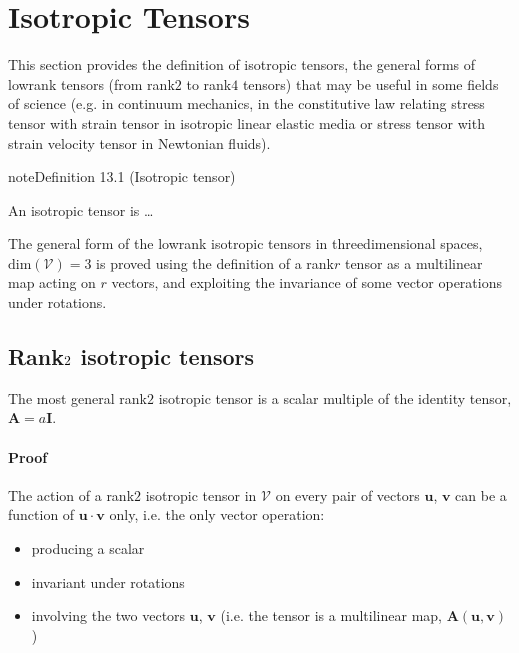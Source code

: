 \documentclass[letterpaper,10pt,english]{jupyterBook}
\begin{document}
\sphinxstepscope


\chapter{Isotropic Tensors}
\label{\detokenize{ch/tensor-algebra-calculus/algebra-isotropic-tensors:isotropic-tensors}}\label{\detokenize{ch/tensor-algebra-calculus/algebra-isotropic-tensors:tensor-algebra-isotropic-tensors}}\label{\detokenize{ch/tensor-algebra-calculus/algebra-isotropic-tensors::doc}}
\sphinxAtStartPar
This section provides the definition of isotropic tensors, the general forms of low\sphinxhyphen{}rank tensors (from rank\sphinxhyphen{}\(2\) to rank\sphinxhyphen{}\(4\) tensors) that may be useful in some fields of science (e.g. in continuum mechanics, in the constitutive law relating stress tensor with strain tensor in isotropic linear elastic media or stress tensor with strain velocity tensor in Newtonian fluids).
\label{ch/tensor-algebra-calculus/algebra-isotropic-tensors:def-tensor-isotropic}
\begin{sphinxadmonition}{note}{Definition 13.1 (Isotropic tensor)}



\sphinxAtStartPar
An isotropic tensor is …
\end{sphinxadmonition}

\sphinxAtStartPar
The general form of the low\sphinxhyphen{}rank isotropic tensors in three\sphinxhyphen{}dimensional spaces, \(\text{dim}\left( \mathscr{V} \right) = 3\) is proved using the definition of a rank\sphinxhyphen{}\(r\) tensor as a multilinear map acting on \(r\) vectors, and exploiting the invariance of some vector operations under rotations.


\section{Rank\sphinxhyphen{}\protect\(2\protect\) isotropic tensors}
\label{\detokenize{ch/tensor-algebra-calculus/algebra-isotropic-tensors:rank-2-isotropic-tensors}}
\sphinxAtStartPar
The most general rank\sphinxhyphen{}\(2\) isotropic tensor is a scalar multiple of the identity tensor, \(\mathbf{A} = a \mathbf{I}\).
\subsubsection*{Proof}

\sphinxAtStartPar
The action of a rank\sphinxhyphen{}\(2\) isotropic tensor in \(\mathscr{V}\) on every pair of vectors \(\mathbf{u}\), \(\mathbf{v}\) can be a function of \(\mathbf{u} \cdot \mathbf{v}\) only, i.e. the only vector operation:
\begin{itemize}
\item {} 
\sphinxAtStartPar
producing a scalar

\item {} 
\sphinxAtStartPar
invariant under rotations

\item {} 
\sphinxAtStartPar
involving the two vectors \(\mathbf{u}\), \(\mathbf{v}\) (i.e. the tensor is a multilinear map, \(\mathbf{A}(\mathbf{u}, \mathbf{v})\))

\end{itemize}
\end{document}
